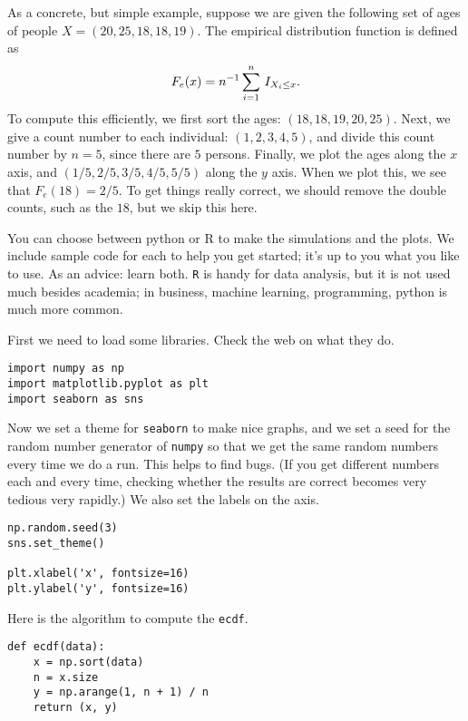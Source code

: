 \documentclass[a4paper]{article}
\begin{document}
As a concrete, but simple example, suppose we are given the following set of ages of people \(X = (20, 25, 18, 18, 19)\). The empirical distribution function is defined as
\begin{equation*}
F_e(x) = n^{-1}\sum_{i=1}^n \,I_{X_i\leq x}.
\end{equation*}
To compute this efficiently, we first sort the ages: \((18, 18, 19, 20, 25)\). Next, we give a count number to each individual: \((1,2,3,4,5)\), and divide this count number by \(n=5\), since there are \(5\) persons. Finally, we plot the ages along the \(x\) axis, and \((1/5, 2/5, 3/5, 4/5, 5/5)\) along the \(y\) axis. When we plot this, we see that \(F_{e}(18) = 2/5\). To get things really correct, we should remove the double counts, such as the \(18\), but we skip this here. 


You can choose between  python  or R to make the simulations and the plots.
We include sample code for each to help you get started; it's up to you what you like to use.
As an advice: learn both.
\texttt{R} is handy for data analysis, but it is not used much besides academia; in business, machine learning, programming, python is much more common. 


First we need to load some libraries. Check the web on what they do.


\begin{verbatim}
import numpy as np
import matplotlib.pyplot as plt
import seaborn as sns
\end{verbatim}

Now we set a theme for \texttt{seaborn} to make nice graphs, and we set a seed for the random number generator of \texttt{numpy} so that we get the same random numbers every time we do a run.
This helps to find bugs.
(If you get different numbers each and every time, checking whether the results are correct becomes very tedious very rapidly.)
We also set the labels on the axis.

\begin{verbatim}
np.random.seed(3)
sns.set_theme()

plt.xlabel('x', fontsize=16)
plt.ylabel('y', fontsize=16)
\end{verbatim}


Here is the algorithm to compute the \texttt{ecdf}.
\begin{verbatim}
def ecdf(data):
    x = np.sort(data)
    n = x.size
    y = np.arange(1, n + 1) / n
    return (x, y)
\end{verbatim}
\end{document}
